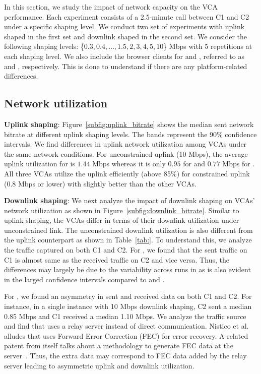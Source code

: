 In this section, we study the impact of network capacity on the VCA performance. Each experiment consists of a 2.5-minute call between C1 and C2 under a specific shaping level. We conduct two set of experiments with uplink shaped in the first set and downlink shaped in the second set. We consider the following shaping levels: \{$0.3, 0.4, \dots, 1.5, 2, 3, 4, 5, 10$\} Mbps with 5 repetitions at each shaping level.  We also include the browser clients for \zoom and \teams, referred to as \zoombrowser and \teamsbrowser, respectively. This is done to understand if there are any platform-related differences. 




\subsection{Network utilization}
\textbf{Uplink shaping}: Figure~\ref{subfig:uplink_bitrate} shows the median sent network bitrate at different uplink shaping levels. The bands represent the 90\% confidence intervals. We find differences in uplink network utilization among VCAs under the same network conditions. For unconstrained uplink (10 Mbps), the average uplink utilization for \teamsnative is $1.44$ Mbps whereas it is only $0.95$ for \meet and $0.77$ Mbps for \zoom. All three VCAs utilize the uplink efficiently (above 85\%) for constrained uplink (0.8 Mbps or lower) with \meet slightly better than the other VCAs.  


\textbf{Downlink shaping}: We next analyze the impact of downlink shaping on VCAs' network utilization as shown in Figure~\ref{subfig:downlink_bitrate}. Similar to uplink shaping, the VCAs differ in terms of their downlink utilization under unconstrained link. The unconstrained downlink utilization is also different from the uplink counterpart as shown in Table~\ref{tab:}. To understand this, we analyze the traffic captured on both C1 and C2. For \teams, we found that the sent traffic on C1 is almost same as the received traffic on C2 and vice versa. Thus, the differences may largely be due to the variability across runs in \teams as is also evident in the larged confidence intervals compared to \zoom and \meet. 

For \zoom, we found an asymmetry in sent and received data on both C1 and C2. For instance, in a single instance with 10 Mbps downlink shaping, C2 sent a median 0.85 Mbps and C1 received a median 1.10 Mbps. We analyze the traffic source and find that \zoom uses a relay server instead of direct communication. Nistico et al.~\cite{nistico2020comparative} alludes that \zoom uses Forward Error Correction (FEC) for error recovery. A related patent from \zoom itself talks about a methodology to generate FEC data at the server~\cite{liu2019error}. Thus, the extra data may correspond to FEC data added by the relay server leading to asymmetric uplink and downlink utilization.  

